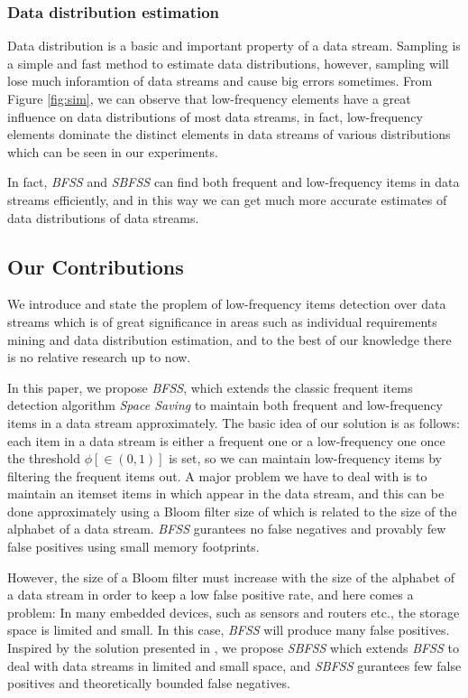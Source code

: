 \documentclass[conference]{IEEEtran}
\begin{document}
\subsubsection{Data distribution estimation}
Data distribution is a basic and important property of a data stream. Sampling is a simple and fast method to estimate data distributions, however, sampling will lose much inforamtion of data streams and cause big errors sometimes. From Figure \ref{fig:sim}, we can observe that low-frequency elements have a great influence on data distributions of most data streams, in fact, low-frequency elements dominate the distinct elements in data streams of various distributions which can be seen in our experiments. \par 
In fact, \emph{BFSS} and \emph{SBFSS} can find both frequent and low-frequency items in data streams efficiently, and in this way we can get much more accurate estimates of data distributions of data streams.

\subsection{Our Contributions}
We introduce and state the proplem of low-frequency items detection over data streams which is of great significance in areas such as individual requirements mining and data distribution estimation, and to the best of our knowledge there is no relative research up to now.\par

In this paper, we propose \emph{BFSS}, which extends the classic frequent items detection algorithm \emph{Space Saving} to maintain both frequent and low-frequency items in a data stream approximately. The basic idea of our solution is as follows: each item in a data stream is either a frequent one or a low-frequency one once the threshold $\phi[\in (0,1)]$ is set, so we can maintain low-frequency items by filtering the frequent items out. A major problem we have to deal with is to maintain an itemset items in which appear in the data stream, and this can be done approximately using a Bloom filter size of which is related to the size of the alphabet of a data stream. \emph{BFSS} gurantees no false negatives and provably few false positives using small memory footprints.\par

However, the size of a Bloom filter must increase with the size of the alphabet of a data stream in order to keep a low false positive rate, and here comes a problem: In many embedded devices, such as sensors and routers etc., the storage space is limited and small. In this case, \emph{BFSS} will produce many false positives. Inspired by the solution presented in \cite{IEEEexample:sbf}, we propose \emph{SBFSS} which extends \emph{BFSS} to deal with data streams in limited and small space, and \emph{SBFSS} gurantees few false positives and theoretically bounded false negatives.\par
\end{document}
